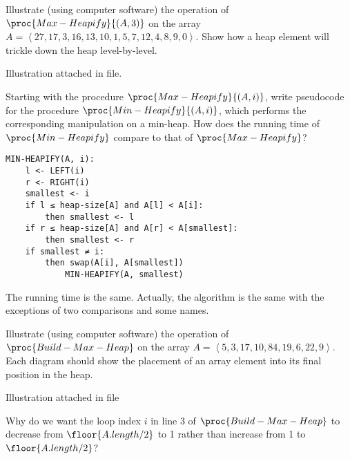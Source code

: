 \documentclass[11pt,addpoints]{exam}
\begin{document}
\begin{questions}
%
\question[10]
Illustrate (using computer software) the operation of $\proc{Max-Heapify}{(A,3)}$ on the array $A = \left< 27, 17, 3, 16, 13, 10, 1, 5, 7, 12, 4, 8, 9, 0\right>$.  Show how a heap element will trickle down the heap level-by-level.

\begin{center}
	Illustration attached in file.
\end{center}

\ifprintanswers
\newpage
\else
\bigskip
\fi


%
\question[5]
Starting with the procedure $\proc{Max-Heapify}{(A,i)}$, write pseudocode for the procedure $\proc{Min-Heapify}{(A,i)}$, which performs the corresponding manipulation on a min-heap.  How does the running time of $\proc{Min-Heapify}$ compare to that of $\proc{Max-Heapify}$?

\begin{lstlisting}
MIN-HEAPIFY(A, i):
	l <- LEFT(i)
	r <- RIGHT(i)
	smallest <- i
	if l ≤ heap-size[A] and A[l] < A[i]:
		then smallest <- l
	if r ≤ heap-size[A] and A[r] < A[smallest]:
		then smallest <- r
	if smallest ≠ i:
		then swap(A[i], A[smallest])
			MIN-HEAPIFY(A, smallest)
\end{lstlisting}
\begin{center}
	The running time is the same. Actually, the algorithm is the same with the exceptions of two comparisons and some names.
\end{center}

\ifprintanswers
\newpage
\else
\bigskip
\fi
	
	
%
\question[10]
Illustrate (using computer software) the operation of $\proc{Build-Max-Heap}$ on the array $A = \left< 5, 3, 17, 10, 84, 19, 6, 22, 9\right>$.  Each diagram should show the placement of an array element into its final position in the heap.  

\begin{center}
	Illustration attached in file
\end{center}

\ifprintanswers
\newpage
\else
\bigskip
\fi
	
	
%
\question[5]
Why do we want the loop index $i$ in line 3 of $\proc{Build-Max-Heap}$ to decrease from $\floor{A.length/2}$ to 1 rather than increase from 1 to $\floor{A.length/2}$?


\end{questions}
\end{document}
